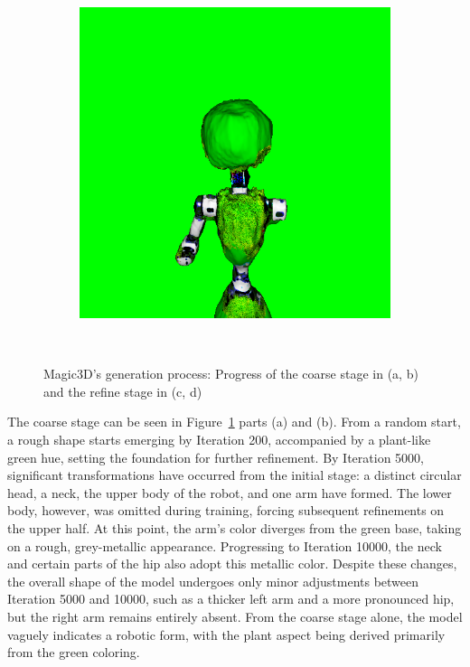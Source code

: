 \begin{figure}[H]
\begin{subfigure}[b]{0.2\textwidth}
        \includegraphics[width=\textwidth]{figures/generationProcess/magic3D_refine_robot_10000_part1.png}
        \caption{}
    \end{subfigure}
    \caption{Magic3D's generation process: Progress of the coarse stage in (a, b) and the refine stage in (c, d)}~\label{fig:generationMagic3D}
\end{figure} 

The coarse stage can be seen in Figure~\ref{fig:generationMagic3D} parts (a) and (b). From a random start, a rough shape starts emerging by Iteration 200, accompanied by a plant-like green hue, setting the foundation for further refinement. By Iteration 5000, significant transformations have occurred from the initial stage: a distinct circular head, a neck, the upper body of the robot, and one arm have formed. The lower body, however, was omitted during training, forcing subsequent refinements on the upper half. At this point, the arm's color diverges from the green base, taking on a rough, grey-metallic appearance. Progressing to Iteration 10000, the neck and certain parts of the hip also adopt this metallic color. Despite these changes, the overall shape of the model undergoes only minor adjustments between Iteration 5000 and 10000, such as a thicker left arm and a more pronounced hip, but the right arm remains entirely absent. From the coarse stage alone, the model vaguely indicates a robotic form, with the plant aspect being derived primarily from the green coloring.


